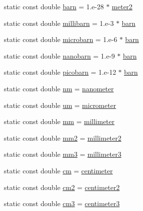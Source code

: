 \begin{DoxyCompactItemize}
static const double \hyperlink{namespacedd4hep_a561a205dfb5e2f3151e032ad640f1d35}{barn} = 1.e-\/28 $\ast$ \hyperlink{namespacedd4hep_afe718b0d811af6b4d45c556e3a0e87a3}{meter2}
\item 
static const double \hyperlink{namespacedd4hep_af4d3d1b2777005b2e1406992fe27e976}{millibarn} = 1.e-\/3 $\ast$ \hyperlink{namespacedd4hep_a561a205dfb5e2f3151e032ad640f1d35}{barn}
\item 
static const double \hyperlink{namespacedd4hep_a6547f374ef4d563258406069e1b659e0}{microbarn} = 1.e-\/6 $\ast$ \hyperlink{namespacedd4hep_a561a205dfb5e2f3151e032ad640f1d35}{barn}
\item 
static const double \hyperlink{namespacedd4hep_a7a705d86fd74fe189400eed71a94fc0c}{nanobarn} = 1.e-\/9 $\ast$ \hyperlink{namespacedd4hep_a561a205dfb5e2f3151e032ad640f1d35}{barn}
\item 
static const double \hyperlink{namespacedd4hep_a5b0a18e0239e264a79ce5e86724a0068}{picobarn} = 1.e-\/12 $\ast$ \hyperlink{namespacedd4hep_a561a205dfb5e2f3151e032ad640f1d35}{barn}
\item 
static const double \hyperlink{namespacedd4hep_a4d2ce915ee05dfc3b7b1c503561e87f1}{nm} = \hyperlink{namespacedd4hep_af784647fab76654e26b09a341d3f9210}{nanometer}
\item 
static const double \hyperlink{namespacedd4hep_a7ca6a7ec6a20ddb5678bd46c47996d26}{um} = \hyperlink{namespacedd4hep_ae1c0791e549db4ff640f02a54c2e4e11}{micrometer}
\item 
static const double \hyperlink{namespacedd4hep_a124f4e9c11400c971e1a829ba8d4a3d0}{mm} = \hyperlink{namespacedd4hep_a1b3044c28560621f033b6f0fb9a15854}{millimeter}
\item 
static const double \hyperlink{namespacedd4hep_a637e0a0b1e9c316aa5581b95204d4fe3}{mm2} = \hyperlink{namespacedd4hep_a1096fbca749064ac09ed44d5a2b37599}{millimeter2}
\item 
static const double \hyperlink{namespacedd4hep_a7ca8a76450060a8f0aa5a0fe68a56b1b}{mm3} = \hyperlink{namespacedd4hep_a2ea09df717c3b153b6ea78fbd517fddc}{millimeter3}
\item 
static const double \hyperlink{namespacedd4hep_a1f3cfefacfa8c2174102824c534c71b8}{cm} = \hyperlink{namespacedd4hep_af17522b334712876a204971dee26c063}{centimeter}
\item 
static const double \hyperlink{namespacedd4hep_aaa4f14a45d39e83ade706dcfce865a35}{cm2} = \hyperlink{namespacedd4hep_a43a537cf81dbb2fb1476264a37bb3945}{centimeter2}
\item 
static const double \hyperlink{namespacedd4hep_a6464c11bda4aa7d6c4d42f70dbcaf803}{cm3} = \hyperlink{namespacedd4hep_a5d565a155d7d3b225e52dc0b97c8186d}{centimeter3}

\end{DoxyCompactItemize}
